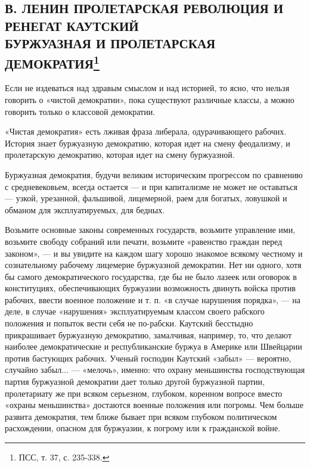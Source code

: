 \documentclass[12pt]{article}
\newcommand{\parnum}{(\arabic{parcount})}
\newcounter{parcount}
\newenvironment{parnumbers}{%
  \par%
  \everypar{\noindent \stepcounter{parcount}\marginpar[]{\parnum}}%
}{}
\begin{document}
\subsection{В. ЛЕНИН ПРОЛЕТАРСКАЯ РЕВОЛЮЦИЯ И РЕНЕГАТ КАУТСКИЙ\\
    БУРЖУАЗНАЯ И ПРОЛЕТАРСКАЯ ДЕМОКРАТИЯ\footnote{ПСС, т. 37, с. 235-338.}}
\begin{parnumbers}
Если не издеваться над здравым смыслом и над историей, то ясно, что нельзя говорить о «чистой демократии», пока существуют различные классы, а можно говорить только о классовой демократии.

«Чистая демократия» есть лживая фраза либерала, одурачивающего рабочих. История знает буржуазную демократию, которая идет на смену феодализму, и пролетарскую демократию, которая идет на смену буржуазной.

Буржуазная демократия, будучи великим историческим прогрессом по сравнению с средневековьем, всегда остается — и при капитализме не может не оставаться — узкой, урезанной, фальшивой, лицемерной, раем для богатых, ловушкой и обманом для эксплуатируемых, для бедных.

Возьмите основные законы современных государств, возьмите управление ими, возьмите свободу собраний или печати, возьмите «равенство граждан перед законом», — и вы увидите на каждом шагу хорошо знакомое всякому честному и сознательному рабочему лицемерие буржуазной демократии. Нет ни одного, хотя бы самого демократического государства, где бы не было лазеек или оговорок в конституциях, обеспечивающих буржуазии возможность двинуть войска против рабочих, ввести военное положение и т. п. «в случае нарушения порядка», — на деле, в случае «нарушения» эксплуатируемым классом своего рабского положения и попыток вести себя не по-рабски. Каутский бесстыдно прикрашивает буржуазную демократию, замалчивая, например, то, что делают наиболее демократические и республиканские буржуа в Америке или Швейцарии против бастующих рабочих. Ученый господин Каутский «забыл» — вероятно, случайно забыл... — «мелочь», именно: что охрану меньшинства господствующая партия буржуазной демократии дает только другой буржуазной партии, пролетариату же при всяком серьезном, глубоком, коренном вопросе вместо «охраны меньшинства» достаются военные положения или погромы. Чем больше развита демократия, тем ближе бывает при всяком глубоком политическом расхождении, опасном для буржуазии, к погрому или к гражданской войне.


\end{parnumbers}
\end{document}
